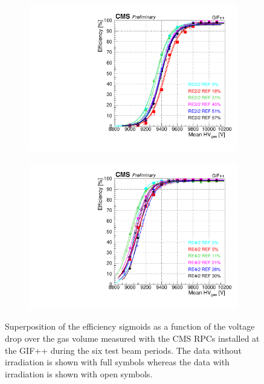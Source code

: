 \begin{figure}[H]
\begin{subfigure}{0.5\linewidth}
    		\includegraphics[width = \linewidth]{fig/chapt5/efficiency_vs_HVgas_RE2_2-REF.pdf}
        	\caption{\label{fig:GIFpp_eff_vs_HVgas:C}}
    	\end{subfigure}
    	\begin{subfigure}{0.5\linewidth}
			\centering
    		\includegraphics[width = \linewidth]{fig/chapt5/efficiency_vs_HVgas_RE4_2-REF.pdf}
        	\caption{\label{fig:GIFpp_eff_vs_HVgas:D}}
    	\end{subfigure}
		\caption{\label{fig:GIFpp_eff_vs_HVgas} Superposition of the efficiency sigmoids as a function of the voltage drop over the gas volume measured with the CMS RPCs installed at the GIF++ during the six test beam periods. The data without irradiation is shown with full symbols whereas the data with irradiation is shown with open symbols.}
	\end{figure}
	

